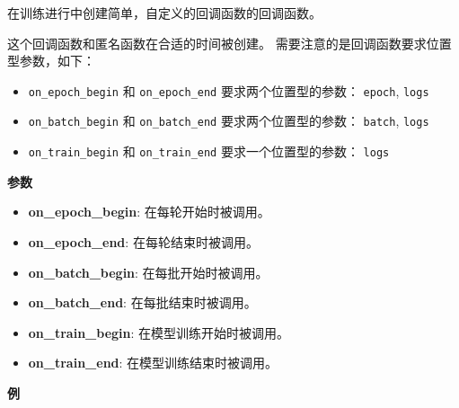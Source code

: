 在训练进行中创建简单，自定义的回调函数的回调函数。

这个回调函数和匿名函数在合适的时间被创建。
需要注意的是回调函数要求位置型参数，如下：

\begin{itemize}
\tightlist
\item
  \texttt{on\_epoch\_begin} 和 \texttt{on\_epoch\_end}
  要求两个位置型的参数： \texttt{epoch}, \texttt{logs}
\item
  \texttt{on\_batch\_begin} 和 \texttt{on\_batch\_end}
  要求两个位置型的参数： \texttt{batch}, \texttt{logs}
\item
  \texttt{on\_train\_begin} 和 \texttt{on\_train\_end}
  要求一个位置型的参数： \texttt{logs}
\end{itemize}

\textbf{参数}

\begin{itemize}
\tightlist
\item
  \textbf{on\_epoch\_begin}: 在每轮开始时被调用。
\item
  \textbf{on\_epoch\_end}: 在每轮结束时被调用。
\item
  \textbf{on\_batch\_begin}: 在每批开始时被调用。
\item
  \textbf{on\_batch\_end}: 在每批结束时被调用。
\item
  \textbf{on\_train\_begin}: 在模型训练开始时被调用。
\item
  \textbf{on\_train\_end}: 在模型训练结束时被调用。
\end{itemize}

\textbf{例}

